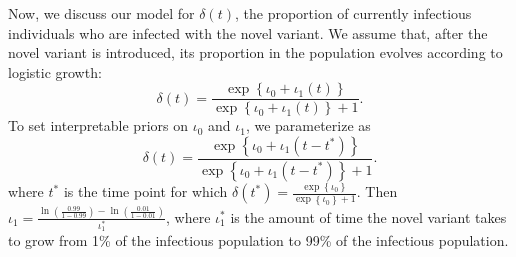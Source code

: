 Now, we discuss our model for \( \delta(t) \), the proportion of currently infectious individuals who are infected with the novel variant.
We assume that, after the novel variant is introduced, its proportion in the population evolves according to logistic growth:
\begin{equation}
    \delta(t) = \frac{\exp \left\{ \iota_0 + \iota_1 \left( t \right) \right\}}{\exp \left\{ \iota_0 + \iota_1 \left( t \right) \right\} + 1}.
    \label{ch_5:eqn:logistic_growth}
\end{equation}
To set interpretable priors on \( \iota_0 \) and \( \iota_1 \), we parameterize as 
\begin{equation}
    \delta(t) = \frac{\exp \left\{ \iota_0 + \iota_1 \left( t - t^* \right) \right\}}{\exp \left\{ \iota_0 + \iota_1 \left( t - t^* \right) \right\} + 1}.
\end{equation}
where \( t^* \) is the time point for which \( \delta(t^*) = \frac{ \exp \left\{ \iota_0 \right\} }{\exp \left\{ \iota_0 \right\} + 1} \).
Then \( \iota_1 = \frac{\ln \left( \frac{0.99}{1 - 0.99} \right) - \ln \left( \frac{0.01}{1 - 0.01} \right)}{\iota_1^*} \), where \( \iota_1^* \) is the amount of time the novel variant takes to grow from 1\% of the infectious population to 99\% of the infectious population.

